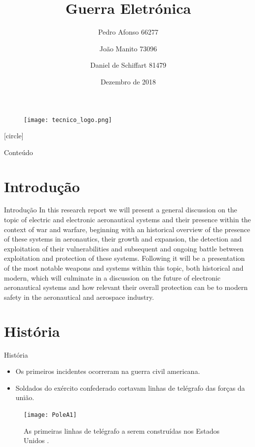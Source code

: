 \documentclass[portuguese,10pt]{beamer}
\title[Guerra Eletrónica]{Guerra Eletrónica}
\author[MEAer -- Sistemas Aviónicos Integrados]{Pedro Afonso 66277 \and João Manito 73096 \and Daniel de Schiffart 81479}
\institute{Sistemas Aviónicos Integrados}
\date{Dezembro de 2018}
\begin{document}
\begin{frame}
    \begin{figure}
	\texttt{[image: tecnico\_logo.png]}
    \end{figure}
    \titlepage
\end{frame}

[circle]

\begin{frame}{Conteúdo}
  \tableofcontents
\end{frame}

\section{Introdução}

\begin{frame}{Introdução}
    In this research report we will present a general discussion on the topic of electric and electronic aeronautical systems and their presence within the context of war and warfare, beginning with an historical overview of the presence of these systems in aeronautics, their growth and expansion, the detection and exploitation of their vulnerabilities and subsequent and ongoing battle between exploitation and protection of these systems. Following it will be a presentation of the most notable weapons and systems within this topic, both historical and modern, which will culminate in a discussion on the future of electronic aeronautical systems and how relevant their overall protection can be to modern safety in the aeronautical and aerospace industry.
\end{frame}

\section{História}

\begin{frame}{História}
    \begin{itemize}
        \item Os primeiros incidentes ocorreram na guerra civil americana.
        \pause
        \item Soldados do exército confederado cortavam linhas de telégrafo das forças da união.
    \end{itemize}
    \begin{figure}[]
        \centering
        \texttt{[image: PoleA1]}
        \caption{As primeiras linhas de telégrafo a serem construídas nos Estados Unidos \cite{polea1}.}
        \label{fig:polea1}
    \end{figure}
\end{frame}
\end{document}
